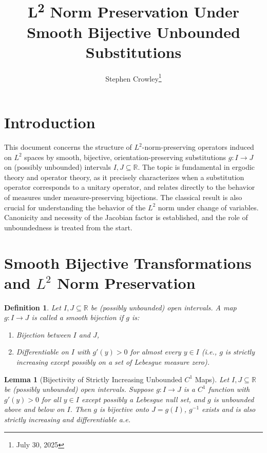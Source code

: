 \documentclass[12pt]{article}
\title{L\textsuperscript{2} Norm Preservation Under Smooth Bijective Unbounded Substitutions}
\author{Stephen Crowley\thanks{July 30, 2025}}
\date{}
\newtheorem{lemma}[theorem]{Lemma}
\newtheorem{definition}[theorem]{Definition}
\begin{document}
\maketitle

\section{Introduction}

This document concerns the structure of $L^2$-norm-preserving operators induced on $L^2$ spaces by smooth, bijective, orientation-preserving substitutions $g : I \to J$ on (possibly unbounded) intervals $I, J \subseteq \mathbb{R}$. The topic is fundamental in ergodic theory and operator theory, as it precisely characterizes when a substitution operator corresponds to a unitary operator, and relates directly to the behavior of measures under measure-preserving bijections. The classical result is also crucial for understanding the behavior of the $L^2$ norm under change of variables. Canonicity and necessity of the Jacobian factor is established, and the role of unboundedness is treated from the start.

\section{Smooth Bijective Transformations and $L^2$ Norm Preservation}

\begin{definition}\label{def:bijectiveC1}
Let $I, J \subseteq \mathbb{R}$ be (possibly unbounded) open intervals. A map $g: I \to J$ is called a \emph{smooth bijection} if $g$ is:
\begin{enumerate}[label=(\roman*)]
    \item Bijection between $I$ and $J$,
    \item Differentiable on $I$ with $g'(y) > 0$ for almost every $y \in I$ (i.e., $g$ is strictly increasing except possibly on a set of Lebesgue measure zero).
\end{enumerate}
\end{definition}

\begin{lemma}[Bijectivity of Strictly Increasing Unbounded $C^1$ Maps]\label{lem:bijective_unbounded}
Let $I, J \subseteq \mathbb{R}$ be (possibly unbounded) open intervals. Suppose $g: I \to J$ is a $C^1$ function with $g'(y) > 0$ for all $y \in I$ except possibly a Lebesgue null set, and $g$ is unbounded above and below on $I$. Then $g$ is bijective onto $J = g(I)$, $g^{-1}$ exists and is also strictly increasing and differentiable a.e.
\end{lemma}
\end{document}
